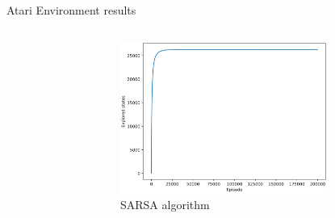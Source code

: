 \begin{frame}{Atari Environment results}
\begin{columns}[c,onlytextwidth]
\begin{figure}
            \end{figure}
            \begin{figure}
                \centering
                \includegraphics[width=0.8\textwidth]{images/atari-sarsa-explored-states.png}
		\caption{SARSA algorithm}
            \end{figure}
    \end{columns}
\end{frame}

